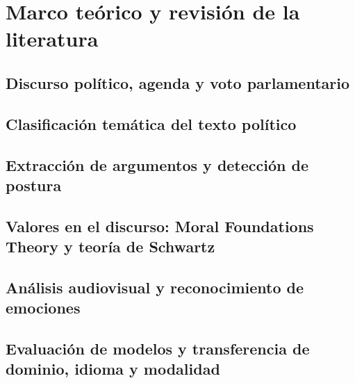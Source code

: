 \chapter{Marco teórico y revisión de la literatura}
\label{cap:marco-teorico}

\section{Discurso político, agenda y voto parlamentario}
\label{sec:discurso-voto}

\section{Clasificación temática del texto político}
\label{sec:clasificacion-tematica}

\section{Extracción de argumentos y detección de postura}
\label{sec:argumentos-postura}

\section{Valores en el discurso: Moral Foundations Theory y teoría de Schwartz}
\label{sec:valores}

\section{Análisis audiovisual y reconocimiento de emociones}
\label{sec:audiovisual}

\section{Evaluación de modelos y transferencia de dominio, idioma y modalidad}
\label{sec:evaluacion-modelos}

